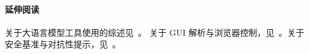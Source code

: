 \paragraph{延伸阅读}
关于大语言模型工具使用的综述见~\citet{shen2024llm,patil2023gorillalargelanguagemodel,qin2023toolllm}。
关于 GUI 解析与浏览器控制，见~\citet{lu2024omniparserpurevisionbased,browser_use2024}。关于
安全基准与对抗性提示，见~\citet{wang2025comprehensive}。



